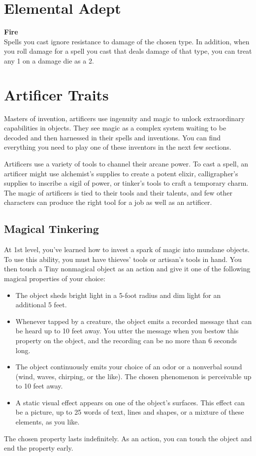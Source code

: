 {\section*{Elemental Adept}
\textbf{Fire}\\
Spells you cast ignore resistance to damage of the chosen type. In addition, when you roll damage for a spell you cast that deals damage of that type, you can treat any 1 on a damage die as a 2.

\section*{Artificer Traits}
Masters of invention, artificers use ingenuity and magic to unlock extraordinary capabilities in objects. They see magic as a complex system waiting to be decoded and then harnessed in their spells and inventions. You can find everything you need to play one of these inventors in the next few sections.

Artificers use a variety of tools to channel their arcane power. To cast a spell, an artificer might use alchemist's supplies to create a potent elixir, calligrapher's supplies to inscribe a sigil of power, or tinker's tools to craft a temporary charm. The magic of artificers is tied to their tools and their talents, and few other characters can produce the right tool for a job as well as an artificer.
\subsection*{Magical Tinkering}
At 1st level, you've learned how to invest a spark of magic into mundane objects. To use this ability, you must have thieves' tools or artisan's tools in hand. You then touch a Tiny nonmagical object as an action and give it one of the following magical properties of your choice:
\begin{itemize}
	\item The object sheds bright light in a 5-foot radius and dim light for an additional 5 feet.
	\item Whenever tapped by a creature, the object emits a recorded message that can be heard up to 10 feet away. You utter the message when you bestow this property on the object, and the recording can be no more than 6 seconds long.
	\item The object continuously emits your choice of an odor or a nonverbal sound (wind, waves, chirping, or the like). The chosen phenomenon is perceivable up to 10 feet away.
	\item A static visual effect appears on one of the object's surfaces. This effect can be a picture, up to 25 words of text, lines and shapes, or a mixture of these elements, as you like.
\end{itemize}
The chosen property lasts indefinitely. As an action, you can touch the object and end the property early.

}
